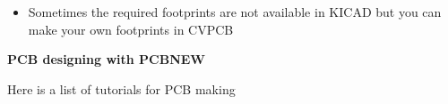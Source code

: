 \documentclass[16pt]{article}
\begin{document}

\begin{itemize}

\item
  Sometimes the required footprints are not available in KICAD but you
  can make your own footprints in CVPCB
\end{itemize}

{\Large{\textbf{PCB designing with
PCBNEW}}}

Here is a list of tutorials for PCB making


\end{document}
